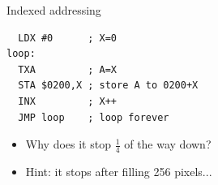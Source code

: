 \begin{frame}[fragile]{Indexed addressing}
	\begin{lstlisting}
  LDX #0      ; X=0
loop:
  TXA         ; A=X
  STA $0200,X ; store A to 0200+X
  INX         ; X++
  JMP loop    ; loop forever
	\end{lstlisting}
	\begin{itemize}
		\pause\item Why does it stop $\frac14$ of the way down?
		\pause\item Hint: it stops after filling 256 pixels...
	\end{itemize}
\end{frame}
